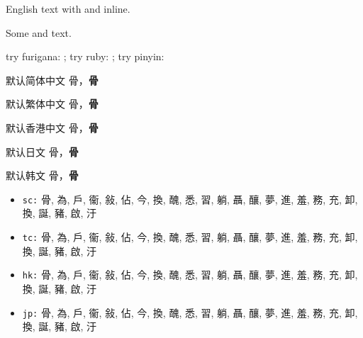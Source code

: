 \documentclass{article}
\begin{document}
English text with  and  inline.

Some  and  text.

try furigana: ; try ruby: ; try pinyin: 


\begin{SCtext}
    默认简体中文 骨，\textbf{骨}
\end{SCtext}

\begin{TCtext}
    默认繁体中文 骨，\textbf{骨}
\end{TCtext}

\begin{HKtext}
    默认香港中文 骨，\textbf{骨}
\end{HKtext}

\begin{JPtext}
    默认日文 骨，\textbf{骨}
\end{JPtext}

\begin{KRtext}
    默认韩文 骨，\textbf{骨}
\end{KRtext}


\begin{itemize}
    \item \texttt{sc:} {\langSC 骨, 為, 戶, 衞, 敍, 佔, 今, 換, 醜, 悉, 習, 躺, 聶, 釀, 夢, 進, 羞, 務, 充, 卸, 換, 誕, 豬, 啟, 汙}
    \item \texttt{tc:} {\langTC 骨, 為, 戶, 衞, 敍, 佔, 今, 換, 醜, 悉, 習, 躺, 聶, 釀, 夢, 進, 羞, 務, 充, 卸, 換, 誕, 豬, 啟, 汙}
    \item \texttt{hk:} {\langHK 骨, 為, 戶, 衞, 敍, 佔, 今, 換, 醜, 悉, 習, 躺, 聶, 釀, 夢, 進, 羞, 務, 充, 卸, 換, 誕, 豬, 啟, 汙}
    \item \texttt{jp:} {\langJP 骨, 為, 戶, 衞, 敍, 佔, 今, 換, 醜, 悉, 習, 躺, 聶, 釀, 夢, 進, 羞, 務, 充, 卸, 換, 誕, 豬, 啟, 汙}
\end{itemize}
\end{document}
